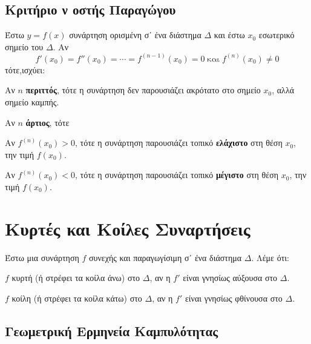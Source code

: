\subsection*{Κριτήριο ν οστής Παραγώγου}

\begin{prop}
  Έστω $ y=f(x) $ συνάρτηση ορισμένη σ᾽ ένα διάστημα $\Delta$ και έστω $ x_{0} $ 
  εσωτερικό σημείο του $\Delta$. Αν 
  \[
    f'(x_{0})=f''(x_{0})=\cdots = f^{(n-1)}(x_{0})=0 \; \text{και} \; f^{(n)}(x_{0}) 
    \neq 0 
  \]
  τότε,ισχύει:
  \begin{myitemize}
    \item Αν $n$ \textbf{περιττός}, τότε η συνάρτηση δεν παρουσιάζει ακρότατο στο σημείο 
      $ x_{0} $, αλλά σημείο καμπής.
    \item Αν $n$ \textbf{άρτιος}, τότε
      \begin{myitemize}
        \item Αν $ f^{(n)}(x_{0}) > 0 $, τότε η συνάρτηση παρουσιάζει τοπικό 
          \textbf{ελάχιστο} στη θέση $ x_{0} $, την τιμή $ f(x_{0}) $.
        \item Αν $ f^{(n)}(x_{0}) < 0 $, τότε η συνάρτηση παρουσιάζει τοπικό 
          \textbf{μέγιστο} στη θέση $ x_{0} $, την τιμή $ f(x_{0}) $.
      \end{myitemize}
  \end{myitemize}
\end{prop}



\section*{Κυρτές και Κοίλες Συναρτήσεις}

\begin{dfn}
  Έστω μια συνάρτηση $f$ συνεχής και παραγωγίσιμη σ᾽ ένα διάστημα $ \Delta $. 
  Λέμε ότι:
  \begin{myitemize}
    \item $f$ κυρτή (ή στρέφει τα κοίλα άνω) στο $ \Delta $, αν η $ f' $ είναι 
      γνησίως αύξουσα στο $ \Delta $.
    \item $f$ κοίλη (ή στρέφει τα κοίλα κάτω) στο $ \Delta $, αν η $ f' $ είναι 
      γνησίως φθίνουσα στο $ \Delta $.
  \end{myitemize}
\end{dfn}


\subsection*{Γεωμετρική Ερμηνεία Καμπυλότητας}

